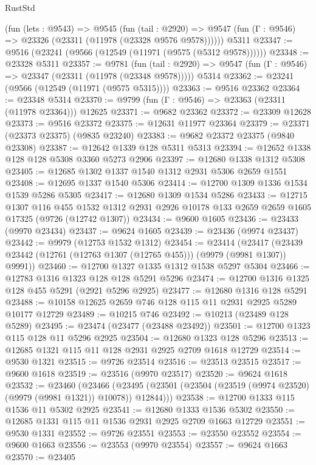 \begin{lexlean}{RustStd}
\begin{coremodule}
    (fun (lets : @9543) =>
    @9545
      (fun (tail : @2920) =>
      @9547 (fun (Γ : @9546) => @23326 (@23311 (@11978 (@23328 @9576 @9578))))))
    @5311
@23347 := @9516 (@23241 (@9566 (@12549 (@11971 (@9575 (@5312 @9578))))))
@23348 := @23328 @5311
@23357 := @9781
    (fun (tail : @2920) => @9547 (fun (Γ : @9546) => @23347 (@23311 (@11978 (@23348 @9578)))))
    @5314
@23362 := @23241 (@9566 (@12549 (@11971 (@9575 @5315))))
@23363 := @9516 @23362
@23364 := @23348 @5314
@23370 := @9799 (fun (Γ : @9546) => @23363 (@23311 (@11978 @23364))) @12625
@23371 := @9682 @23362
@23372 := @23309 @12628
@23373 := @9516 @23372
@23375 := @12631 @11977 @23364
@23379 := @23371 (@23373 @23375) (@9835 @23240)
@23383 := @9682 @23372 @23375 (@9840 @23308)
@23387 := @12642 @1339 @128 @5311 @5313
@23394 := @12652 @1338 @128 @128 @5308 @3360 @5273 @2906
@23397 := @12680 @1338 @1312 @5308
@23405 := @12685 @1302 @1337 @1540 @1312 @2931 @5306 @2659 @1551
@23408 := @12695 @1337 @1540 @5306
@23414 := @12700 @1309 @1336 @1534 @1539 @5286 @5305
@23417 := @12680 @1309 @1534 @5286
@23433 := @12715
    @1307
    @116
    @455
    @1532
    @1312
    @2931
    @2926
    @10178
    @133
    @2659
    @2659
    @1605
    @17325
    (@9726 (@12742 @1307))
@23434 := @9600 @1605
@23436 := @23433 (@9970 @23434)
@23437 := @9624 @1605
@23439 := @23436 (@9974 @23437)
@23442 := @9979 (@12753 @1532 @1312)
@23454 := @23414
    (@23417 (@23439 @23442 (@12761 (@12763 @1307 (@12765 @455))) (@9979 (@9981 @1307)) @9991))
@23460 := @12700 @1327 @1335 @1312 @1538 @5297 @5304
@23466 := @12783 @1316 @1323 @128 @128 @5291 @5296
@23474 := @12700 @1316 @1325 @128 @455 @5291 (@2921 @5296 @2925)
@23477 := @12680 @1316 @128 @5291
@23488 := @10158 @12625 @2659 @746 @128 @115 @11 @2931 @2925 @5289 @10177 @12729
@23489 := @10215 @746
@23492 := @10213 (@23489 @128 @5289)
@23495 := @23474 (@23477 (@23488 @23492))
@23501 := @12700 @1323 @115 @128 @11 @5296 @2925
@23504 := @12680 @1323 @128 @5296
@23513 := @12685 @1321 @115 @11 @128 @2931 @2925 @2709 @1618 @12729
@23514 := @9530 @1321
@23515 := @9726 @23514
@23516 := @23513 @23515
@23517 := @9600 @1618
@23519 := @23516 (@9970 @23517)
@23520 := @9624 @1618
@23532 := @23460
    (@23466 (@23495 (@23501 (@23504 (@23519 (@9974 @23520) (@9979 (@9981 @1321)) @10078)) @12844)))
@23538 := @12700 @1333 @115 @1536 @11 @5302 @2925
@23541 := @12680 @1333 @1536 @5302
@23550 := @12685 @1331 @115 @11 @1536 @2931 @2925 @2709 @1663 @12729
@23551 := @9530 @1331
@23552 := @9726 @23551
@23553 := @23550 @23552
@23554 := @9600 @1663
@23556 := @23553 (@9970 @23554)
@23557 := @9624 @1663
@23570 := @23405

\end{coremodule}
\end{lexlean}
